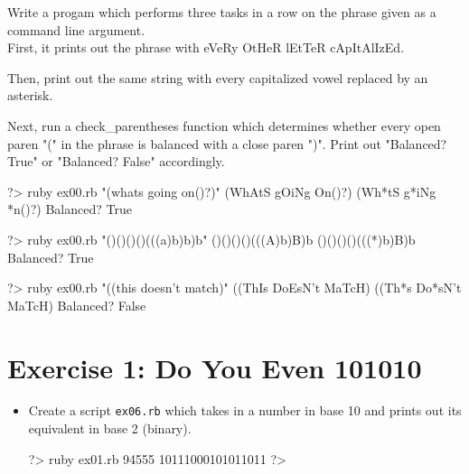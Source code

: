 \documentclass{42-en}
\begin{document}
Write a progam which performs three tasks in a row on the phrase given as a command line argument.\\

First, it prints out the phrase with eVeRy OtHeR lEtTeR cApItAlIzEd.

Then, print out the same string with every capitalized vowel replaced by an asterisk.

Next, run a check\_parentheses function which determines whether every open paren "(" in the phrase is balanced with a close paren ")". Print out "Balanced? True" or "Balanced? False" accordingly. 

\begin{42console}
	?> ruby ex00.rb "(whats going on()?)"
	(WhAtS gOiNg On()?)
	(Wh*tS g*iNg *n()?)
	Balanced? True
\end{42console}

\begin{42console}
	?> ruby ex00.rb "()()()()(((a)b)b)b"
	()()()()(((A)b)B)b
	()()()()(((*)b)B)b
	Balanced? True
\end{42console}

\begin{42console}
	?> ruby ex00.rb "((this doesn't match)"
	((ThIs DoEsN't MaTcH)
	((Th*s Do*sN't MaTcH)
	Balanced? False
\end{42console}




\chapter{Exercise 1: Do You Even 101010}


\makeheaderfiles

\begin{itemize}

\item Create a script \texttt{ex06.rb} which takes in a number in base 10 and prints out its equivalent in base 2 (binary).

\begin{42console}
	?> ruby ex01.rb 94555
	10111000101011011
	?>
\end{42console}

\end{itemize}
\end{document}
